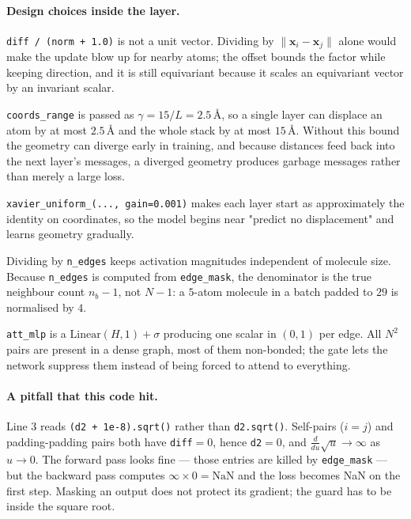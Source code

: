 \documentclass[11pt,a4paper]{article}
\newcommand{\code}[1]{\texttt{#1}}
\newcommand{\bx}{\mathbf{x}}
\begin{document}
\paragraph{Design choices inside the layer.}
\begin{description}[leftmargin=0pt,style=nextline]
\item[The $+1$ in the denominator.] \code{diff / (norm + 1.0)} is not a unit
      vector. Dividing by $\lVert\bx_i-\bx_j\rVert$ alone would make the update
      blow up for nearby atoms; the offset bounds the factor while keeping
      direction, and it is still equivariant because it scales an equivariant
      vector by an invariant scalar.
\item[$\gamma\tanh(\cdot)$.] \code{coords\_range} is passed as
      $\gamma=15/L=2.5$\,\r{A}, so a single layer can displace an atom by at most
      $2.5$\,\r{A} and the whole stack by at most $15$\,\r{A}. Without this bound
      the geometry can diverge early in training, and because distances feed
      back into the next layer's messages, a diverged geometry produces garbage
      messages rather than merely a large loss.
\item[Small initialisation of the coordinate head.]
      \code{xavier\_uniform\_(..., gain=0.001)} makes each layer start as
      approximately the identity on coordinates, so the model begins near
      "predict no displacement" and learns geometry gradually.
\item[Mean rather than sum aggregation.] Dividing by \code{n\_edges} keeps
      activation magnitudes independent of molecule size. Because
      \code{n\_edges} is computed from \code{edge\_mask}, the denominator is the
      true neighbour count $n_b-1$, not $N-1$: a $5$-atom molecule in a batch
      padded to $29$ is normalised by $4$.
\item[The gate.] \code{att\_mlp} is a $\text{Linear}(H,1)+\sigma$ producing one
      scalar in $(0,1)$ per edge. All $N^2$ pairs are present in a dense graph,
      most of them non-bonded; the gate lets the network suppress them instead of
      being forced to attend to everything.
\end{description}

\paragraph{A pitfall that this code hit.} Line 3 reads
\code{(d2 + 1e-8).sqrt()} rather than \code{d2.sqrt()}. Self-pairs ($i=j$) and
padding-padding pairs both have \code{diff}$=0$, hence \code{d2}$=0$, and
$\frac{d}{du}\sqrt{u}\to\infty$ as $u\to0$. The forward pass looks fine --- those
entries are killed by \code{edge\_mask} --- but the backward pass computes
$\infty \times 0 = \text{NaN}$ and the loss becomes NaN on the first step.
Masking an output does not protect its gradient; the guard has to be inside the
square root.
\end{document}
